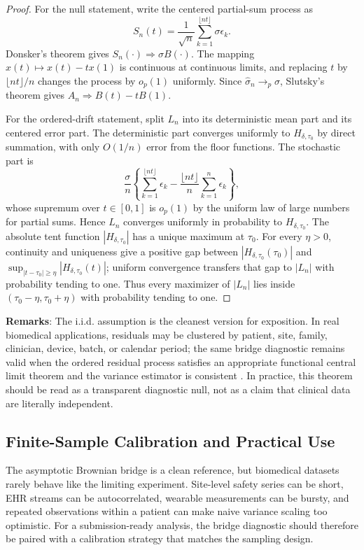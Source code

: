 \documentclass{article}
\theoremstyle{plain}
\theoremstyle{definition}
\begin{document}
\begin{proof}
For the null statement, write the centered partial-sum process as
\[
S_n(t)=\frac{1}{\sqrt n}\sum_{k=1}^{\lfloor nt\rfloor}\sigma\epsilon_k.
\]
Donsker's theorem gives $S_n(\cdot)\Rightarrow \sigma B(\cdot)$. The mapping $x(t)\mapsto x(t)-tx(1)$ is continuous at continuous limits, and replacing $t$ by $\lfloor nt\rfloor/n$ changes the process by $o_p(1)$ uniformly. Since $\widehat{\sigma}_n\to_p\sigma$, Slutsky's theorem gives $A_n\Rightarrow B(t)-tB(1)$.

For the ordered-drift statement, split $L_n$ into its deterministic mean part and its centered error part. The deterministic part converges uniformly to $H_{\delta,\tau_0}$ by direct summation, with only $O(1/n)$ error from the floor functions. The stochastic part is
\[
\frac{\sigma}{n}\left\{\sum_{k=1}^{\lfloor nt\rfloor}\epsilon_k
-\frac{\lfloor nt\rfloor}{n}\sum_{k=1}^{n}\epsilon_k\right\},
\]
whose supremum over $t\in[0,1]$ is $o_p(1)$ by the uniform law of large numbers for partial sums. Hence $L_n$ converges uniformly in probability to $H_{\delta,\tau_0}$. The absolute tent function $|H_{\delta,\tau_0}|$ has a unique maximum at $\tau_0$. For every $\eta>0$, continuity and uniqueness give a positive gap between $|H_{\delta,\tau_0}(\tau_0)|$ and $\sup_{|t-\tau_0|\ge\eta}|H_{\delta,\tau_0}(t)|$; uniform convergence transfers that gap to $|L_n|$ with probability tending to one. Thus every maximizer of $|L_n|$ lies inside $(\tau_0-\eta,\tau_0+\eta)$ with probability tending to one.
\end{proof}

\textbf{Remarks}: The i.i.d. assumption is the cleanest version for exposition. In real biomedical applications, residuals may be clustered by patient, site, family, clinician, device, batch, or calendar period; the same bridge diagnostic remains valid when the ordered residual process satisfies an appropriate functional central limit theorem and the variance estimator is consistent \citep{billingsley2013convergence,vandervaart1996weak,kosorok2008introduction}. In practice, this theorem should be read as a transparent diagnostic null, not as a claim that clinical data are literally independent.

\subsection{Finite-Sample Calibration and Practical Use}

The asymptotic Brownian bridge is a clean reference, but biomedical datasets
rarely behave like the limiting experiment. Site-level safety series can be
short, EHR streams can be autocorrelated, wearable measurements can be
bursty, and repeated observations within a patient can make naive variance
scaling too optimistic. For a submission-ready analysis, the bridge
diagnostic should therefore be paired with a calibration strategy that
matches the sampling design.
\end{document}
